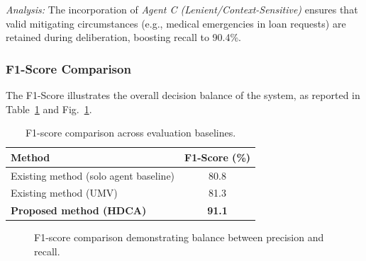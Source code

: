 \documentclass[a4paper,fleqn]{cas-sc}
\begin{document}
\textit{Analysis:} The incorporation of \textit{Agent C (Lenient/Context-Sensitive)} ensures that valid mitigating circumstances (e.g., medical emergencies in loan requests) are retained during deliberation, boosting recall to 90.4\%.

\subsubsection{F1-Score Comparison}
The F1-Score illustrates the overall decision balance of the system, as reported in Table~\ref{tab:f1} and Fig.~\ref{fig:f1_chart}.

\begin{table}[pos=H]
\caption{F1-score comparison across evaluation baselines.}
\label{tab:f1}
\centering
\begin{tabular}{lc}
\hline
\textbf{Method} & \textbf{F1-Score (\%)} \\
\hline
Existing method (solo agent baseline) & 80.8 \\
Existing method (UMV) & 81.3 \\
\textbf{Proposed method (HDCA)} & \textbf{91.1} \\
\hline
\end{tabular}
\end{table}

\begin{figure}[pos=H]
\centering
{}
\caption{F1-score comparison demonstrating balance between precision and recall.}
\label{fig:f1_chart}
\end{figure}
\end{document}
